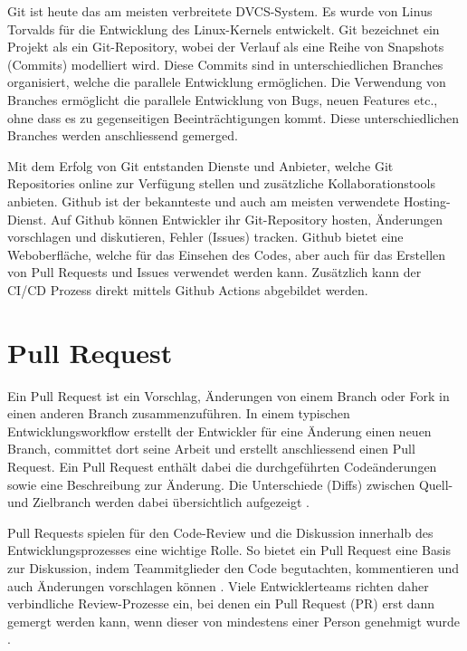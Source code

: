 Git ist heute das am meisten verbreitete DVCS-System. Es wurde von Linus Torvalds für die Entwicklung des Linux-Kernels entwickelt. \parencite{zack_git_2018} Git bezeichnet ein Projekt als ein Git-Repository, wobei der Verlauf als eine Reihe von Snapshots (Commits) modelliert wird. Diese Commits sind in unterschiedlichen Branches organisiert, welche die parallele Entwicklung ermöglichen. Die Verwendung von Branches ermöglicht die parallele Entwicklung von Bugs, neuen Features etc., ohne dass es zu gegenseitigen Beeinträchtigungen kommt. Diese unterschiedlichen Branches werden anschliessend gemerged. 

Mit dem Erfolg von Git entstanden Dienste und Anbieter, welche Git Repositories online zur Verfügung stellen und zusätzliche Kollaborationstools anbieten. Github ist der bekannteste und auch am meisten verwendete Hosting-Dienst. Auf Github können Entwickler ihr Git-Repository hosten, Änderungen vorschlagen und diskutieren, Fehler (Issues) tracken. Github bietet eine Weboberfläche, welche für das Einsehen des Codes, aber auch für das Erstellen von Pull Requests und Issues verwendet werden kann. Zusätzlich kann der CI/CD Prozess direkt mittels Github Actions abgebildet werden. \parencite{noauthor_informationen_2025}  

\section{Pull Request} 
Ein Pull Request ist ein Vorschlag, Änderungen von einem Branch oder Fork in einen anderen Branch zusammenzuführen. In einem typischen Entwicklungsworkflow erstellt der Entwickler für eine Änderung einen neuen Branch, committet dort seine Arbeit und erstellt anschliessend einen Pull Request. Ein Pull Request enthält dabei die durchgeführten Codeänderungen sowie eine Beschreibung zur Änderung. Die Unterschiede (Diffs) zwischen Quell- und Zielbranch werden dabei übersichtlich aufgezeigt \parencite{noauthor_about_nodate}.

Pull Requests spielen für den Code-Review und die Diskussion innerhalb des Entwicklungsprozesses eine wichtige Rolle. So bietet ein Pull Request eine Basis zur Diskussion, indem Teammitglieder den Code begutachten, kommentieren und auch Änderungen vorschlagen können \parencite{atlassian_pull_nodate}. Viele Entwicklerteams richten daher verbindliche Review-Prozesse ein, bei denen ein Pull Request (PR) erst dann gemergt werden kann, wenn dieser von mindestens einer Person genehmigt wurde \parencite{jiang_how_2022}.

